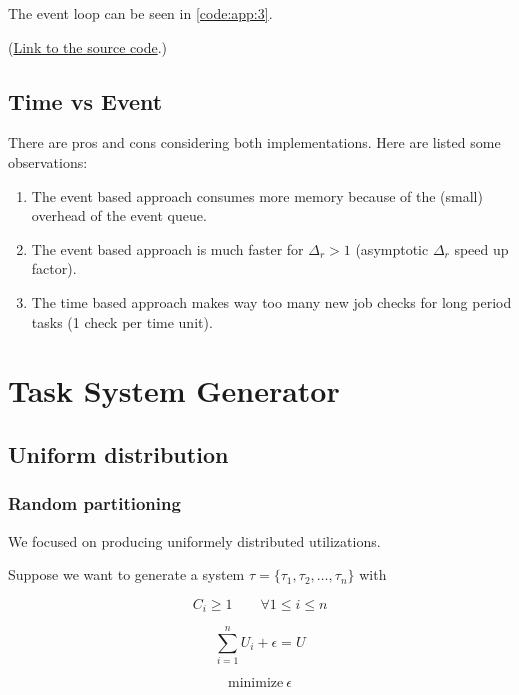 \documentclass[a4paper,12pt]{article}
\begin{document}
The event loop can be seen in \ref{code:app:3}.


(\href{../h/os/llf_scheduler_event_based.h}{Link to the source code}.)
\subsection{Time vs Event}

There are pros and cons considering both implementations. Here are listed some observations:

\begin{enumerate}
	\item The event based approach consumes more memory because of the (small) overhead of the event queue.
	\item The event based approach is much faster for $\Delta_r > 1$ (asymptotic $\Delta_r$ speed up factor).
	\item The time based approach makes way too many new job checks for long period tasks (1 check per time unit).
\end{enumerate}

\newpage\cleardoublepage{}
\section{Task System Generator}
\label{sec:gen}
\subsection{Uniform distribution}

\subsubsection{Random partitioning}

We focused on producing uniformely distributed utilizations.

Suppose we want to generate a system $\tau = \{\tau_1 , \tau_2 , \dots , \tau_n \}$ with

\begin{equation}
	C_i \geq 1 \qquad \forall 1 \leq i \leq n
	\label{eq:WCET minimum}
\end{equation}

\begin{equation}
	\sum_{i=1}^{n} U_i + \epsilon = U
	\label{eq:Usage shift}
\end{equation}

\begin{equation}
	\text{minimize}~\epsilon
	\label{eq:Economic function of the generator}
\end{equation}
\end{document}
